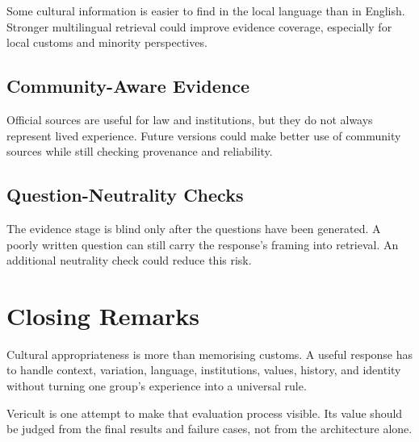 Some cultural information is easier to find in the local language than in English. Stronger multilingual retrieval could improve evidence coverage, especially for local customs and minority perspectives.

\subsection{Community-Aware Evidence}

Official sources are useful for law and institutions, but they do not always represent lived experience. Future versions could make better use of community sources while still checking provenance and reliability.

\subsection{Question-Neutrality Checks}

The evidence stage is blind only after the questions have been generated. A poorly written question can still carry the response's framing into retrieval. An additional neutrality check could reduce this risk.

\section{Closing Remarks}

Cultural appropriateness is more than memorising customs. A useful response has to handle context, variation, language, institutions, values, history, and identity without turning one group's experience into a universal rule.

Vericult is one attempt to make that evaluation process visible. Its value should be judged from the final results and failure cases, not from the architecture alone.
